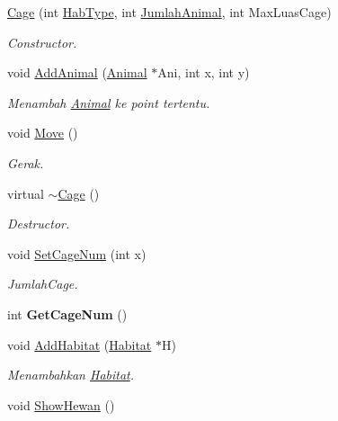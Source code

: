 \begin{DoxyCompactItemize}
\item 
\hyperlink{class_cage_a60e37f6ee39538735bddde13e91a9758}{Cage} (int \hyperlink{class_cage_a84ab0098eebdb6ce6d00a64533eb963c}{Hab\+Type}, int \hyperlink{class_cage_a4e04166edf60c708910a7b1c6d81bf3a}{Jumlah\+Animal}, int Max\+Luas\+Cage)
\begin{DoxyCompactList}\small\item\em Constructor. \end{DoxyCompactList}\item 
void \hyperlink{class_cage_ac7b058e3bcad6642edcc1078a393ceb8}{Add\+Animal} (\hyperlink{class_animal}{Animal} $\ast$Ani, int x, int y)
\begin{DoxyCompactList}\small\item\em Menambah \hyperlink{class_animal}{Animal} ke point tertentu. \end{DoxyCompactList}\item 
void \hyperlink{class_cage_a449f19d08289f70a140955a99769ae4a}{Move} ()\hypertarget{class_cage_a449f19d08289f70a140955a99769ae4a}{}\label{class_cage_a449f19d08289f70a140955a99769ae4a}

\begin{DoxyCompactList}\small\item\em Gerak. \end{DoxyCompactList}\item 
virtual \hyperlink{class_cage_a657259499dfc23c63fc65aeaf8abbb17}{$\sim$\+Cage} ()\hypertarget{class_cage_a657259499dfc23c63fc65aeaf8abbb17}{}\label{class_cage_a657259499dfc23c63fc65aeaf8abbb17}

\begin{DoxyCompactList}\small\item\em Destructor. \end{DoxyCompactList}\item 
void \hyperlink{class_cage_a6cf474c9514e4ed3b344ae11548a15ad}{Set\+Cage\+Num} (int x)
\begin{DoxyCompactList}\small\item\em Jumlah\+Cage. \end{DoxyCompactList}\item 
int {\bfseries Get\+Cage\+Num} ()\hypertarget{class_cage_a46e5715ddcb28e5a2d7f79884f28a90a}{}\label{class_cage_a46e5715ddcb28e5a2d7f79884f28a90a}

\item 
void \hyperlink{class_cage_aec2f91bbd16b0997b787ac0cc8afa5b5}{Add\+Habitat} (\hyperlink{class_habitat}{Habitat} $\ast$H)
\begin{DoxyCompactList}\small\item\em Menambahkan \hyperlink{class_habitat}{Habitat}. \end{DoxyCompactList}\item 
void \hyperlink{class_cage_ac0bc91af45c6eb9a8174c4387310348d}{Show\+Hewan} ()\hypertarget{class_cage_ac0bc91af45c6eb9a8174c4387310348d}{}\label{class_cage_ac0bc91af45c6eb9a8174c4387310348d}


\end{DoxyCompactItemize}
